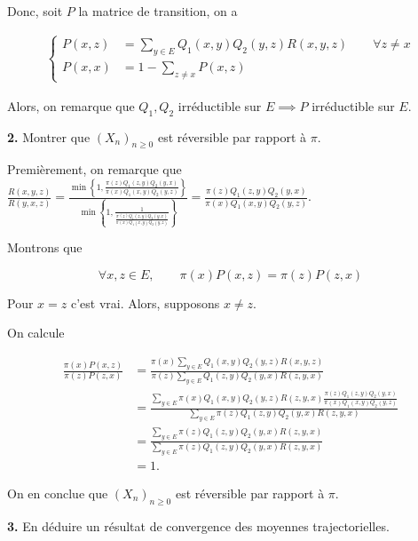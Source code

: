 \documentclass[french]{article}
\begin{document}
	Donc, soit $P$ la matrice de transition, on a
	
	\begin{align}
	\begin{cases}
	P(x, z) &= \sum_{y \in E} Q_1(x, y) Q_2(y, z) R(x,y,z) \qquad \forall z \not=x \\
	P(x, x) &= 1 - \sum_{z \not= x} P(x,z)
	\end{cases}
	\end{align}
	
	Alors, on remarque que $Q_1, Q_2$ irréductible sur $E \implies P$ irréductible sur $E$. 

	\begin{tcolorbox}[colback=gray!5!white,colframe=gray!75!black]
		\textbf{2.} Montrer que $(X_n)_{n \geq 0}$ est réversible par rapport à $\pi$.
	\end{tcolorbox}

	Premièrement, on remarque que $\frac{R(x,y,z)}{R(y,x,z)} = \frac{\min\left\{1, \frac{\pi(z) Q_1(z,y) Q_2(y, x)}{\pi(x) Q_1(x,y) Q_2(y,z)} \right\}}{\min\left\{1, \frac{1}{\frac{\pi(z) Q_1(z,y) Q_2(y, x)}{\pi(x) Q_1(x,y) Q_2(y,z)}} \right\}}  = \frac{\pi(z) Q_1(z,y) Q_2(y, x)}{\pi(x) Q_1(x,y) Q_2(y,z)}$.
	
	Montrons que
	
	$$\forall x,z \in E, \qquad \pi(x)P(x,z) = \pi(z)P(z,x)$$
	
	Pour $x=z$ c'est vrai. Alors, supposons $x \not= z$.
	
	On calcule
	
	\begin{align}
	\frac{\pi(x)P(x,z)}{\pi(z)P(z,x)} &= \frac{\pi(x) \sum_{y \in E} Q_1(x, y) Q_2(y, z) R(x,y,z)}{\pi(z) \sum_{y \in E} Q_1(z, y) Q_2(y, x) R(z,y,x)} \\
	&= \frac{\sum_{y \in E} \pi(x) Q_1(x, y) Q_2(y, z) R(z,y,x) \frac{\pi(z) Q_1(z,y) Q_2(y, x)}{\pi(x) Q_1(x,y) Q_2(y,z)}}{\sum_{y \in E} \pi(z) Q_1(z, y) Q_2(y, x) R(z,y,x)} \\
	&= \frac{\sum_{y \in E} \pi(z) Q_1(z,y) Q_2(y, x) R(z,y,x)}{\sum_{y \in E} \pi(z) Q_1(z, y) Q_2(y, x) R(z,y,x)}\\
	&= 1.
	\end{align}
	
	On en conclue que $(X_n)_{n \geq 0}$ est réversible par rapport à $\pi$.

	\begin{tcolorbox}[colback=gray!5!white,colframe=gray!75!black]
		\textbf{3.} En déduire un résultat de convergence des moyennes trajectorielles.
	\end{tcolorbox}
	
\end{document}
